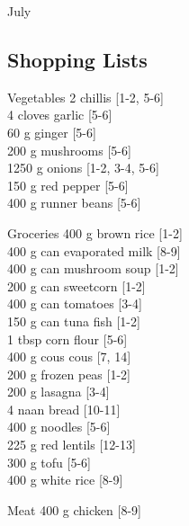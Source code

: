 \begin{menu}{July}
    \subsection*{Shopping Lists}
      \begin{shoppinglist}{Vegetables}
      2  chillis {\scriptsize[1-2, 5-6]}\\
      4 cloves garlic {\scriptsize[5-6]}\\
      60 g ginger {\scriptsize[5-6]}\\
      200 g mushrooms {\scriptsize[5-6]}\\
      1250 g onions {\scriptsize[1-2, 3-4, 5-6]}\\
      150 g red pepper {\scriptsize[5-6]}\\
      400 g runner beans {\scriptsize[5-6]}\\
      \end{shoppinglist}%
      \begin{shoppinglist}{Groceries}
      400 g brown rice {\scriptsize[1-2]}\\
      400 g can evaporated milk {\scriptsize[8-9]}\\
      400 g can mushroom soup {\scriptsize[1-2]}\\
      200 g can sweetcorn {\scriptsize[1-2]}\\
      400 g can tomatoes {\scriptsize[3-4]}\\
      150 g can tuna fish {\scriptsize[1-2]}\\
      1 tbsp corn flour {\scriptsize[5-6]}\\
      400 g cous cous {\scriptsize[7, 14]}\\
      200 g frozen peas {\scriptsize[1-2]}\\
      200 g lasagna {\scriptsize[3-4]}\\
      4  naan bread {\scriptsize[10-11]}\\
      400 g noodles {\scriptsize[5-6]}\\
      225 g red lentils {\scriptsize[12-13]}\\
      300 g tofu {\scriptsize[5-6]}\\
      400 g white rice {\scriptsize[8-9]}\\
      \end{shoppinglist}%
      \par\vfil %
      \begin{shoppinglist}{Meat}
      400 g chicken {\scriptsize[8-9]}\\

\end{shoppinglist}
\end{menu}
